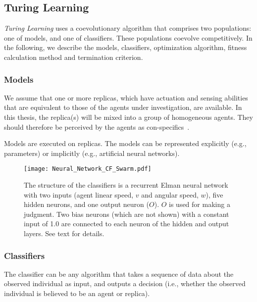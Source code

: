 \subsection{Turing Learning}\label{sec:turing_learning_swarm_simulation}

\textit{Turing Learning} uses a coevolutionary algorithm that comprises two populations: one of models, and one of classifiers. These populations coevolve competitively. In the following, we describe the models, classifiers, optimization algorithm, fitness calculation method and termination criterion. 

\subsubsection{Models} 

We assume that one or more replicas, which have actuation and sensing abilities that are equivalent to those of the agents under investigation, are available. In this thesis, the replica(s) will be mixed into a group of homogeneous agents. They should therefore be perceived by the agents as con-specifics~\cite{J.Halloy2007}. 

Models are executed on replicas. The models can be represented explicitly (e.g., parameters) or implicitly (e.g., artificial neural networks). %

\begin{figure}[!t]
	\centering
	\texttt{[image: Neural\_Network\_CF\_Swarm.pdf]}
	\caption{The structure of the classifiers is a recurrent Elman neural 
    network with two inputs (agent linear speed, $v$ and angular speed, $w$), five hidden neurons, and one output neuron ($O$). $O$ is used for making a judgment. Two bias neurons (which are not shown) with a constant input of 1.0 are connected to each neuron of the hidden and output layers. See text for details.}
	\label{fig:neural_network_cf_swarm}
\end{figure}

\subsubsection{Classifiers}

The classifier can be any algorithm that takes a sequence of data about the observed individual as input, and outputs a decision (i.e., whether the observed individual is believed to be an agent or replica). 


